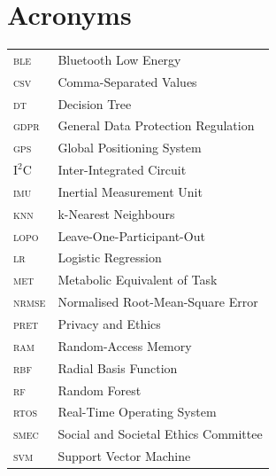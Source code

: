 \section*{Acronyms}

\begin{supertabular}{ll}
\textsc{ble}    & Bluetooth Low Energy\\
\textsc{csv}    & Comma-Separated Values\\
\textsc{dt}     & Decision Tree\\
\textsc{gdpr}   & General Data Protection Regulation\\
\textsc{gps}    & Global Positioning System\\
\(\mathrm{I^2C}\) & Inter-Integrated Circuit\\
\textsc{imu}    & Inertial Measurement Unit\\
\textsc{knn}    & k-Nearest Neighbours\\
\textsc{lopo}   & Leave-One-Participant-Out\\
\textsc{lr}     & Logistic Regression\\
\textsc{met}    & Metabolic Equivalent of Task\\
\textsc{nrmse}  & Normalised Root-Mean-Square Error\\
\textsc{pret}   & Privacy and Ethics\\
\textsc{ram}    & Random-Access Memory\\
\textsc{rbf}    & Radial Basis Function\\
\textsc{rf}     & Random Forest\\
\textsc{rtos}   & Real-Time Operating System\\
\textsc{smec}   & Social and Societal Ethics Committee\\
\textsc{svm}    & Support Vector Machine\\
\end{supertabular}
